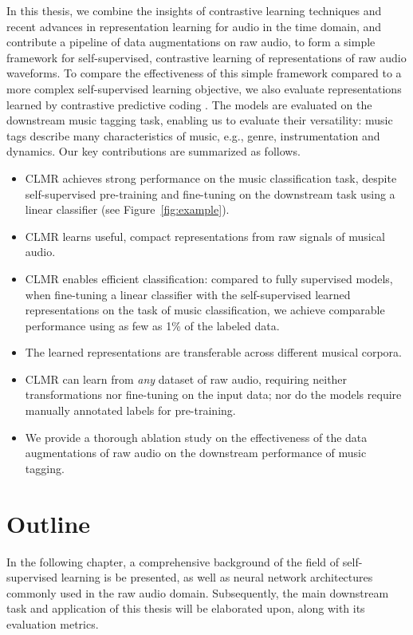 In this thesis, we combine the insights of contrastive learning techniques and recent advances in representation learning for audio in the time domain, and contribute a pipeline of data augmentations on raw audio, to form a simple framework for self-supervised, contrastive learning of representations of raw audio waveforms.
To compare the effectiveness of this simple framework compared to a more complex self-supervised learning objective, we also evaluate representations learned by contrastive predictive coding \cite{oord_representation_2019}.
The models are evaluated on the downstream music tagging task, enabling us to evaluate their versatility: music tags describe many characteristics of music, e.g., genre, instrumentation and dynamics.
Our key contributions are summarized as follows.
\begin{itemize}
    \item CLMR achieves strong performance on the music classification task, despite self-supervised pre-training and fine-tuning on the downstream task using a linear classifier (see Figure~\ref{fig:example}).
    \item CLMR learns useful, compact representations from raw signals of musical audio.
    \item CLMR enables efficient classification: compared to fully supervised models, when fine-tuning a linear classifier with the self-supervised learned representations on the task of music classification, we achieve comparable performance using as few as 1\% of the labeled data.
    \item The learned representations are transferable across different musical corpora.
    \item CLMR can learn from \emph{any} dataset of raw audio, requiring neither transformations nor fine-tuning on the input data; nor do the models require manually annotated labels for pre-training.
    \item We provide a thorough ablation study on the effectiveness of the data augmentations of raw audio on the downstream performance of music tagging.
\end{itemize}

\newpage

\section{Outline}
In the following chapter, a comprehensive background of the field of self-supervised learning is be presented, as well as neural network architectures commonly used in the raw audio domain.
Subsequently, the main downstream task and application of this thesis will be elaborated upon, along with its evaluation metrics.

